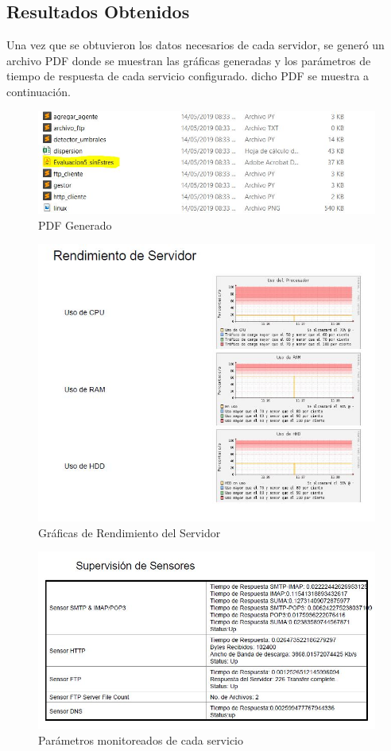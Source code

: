 \subsection{Resultados Obtenidos}
\noindent
Una vez que se obtuvieron los datos necesarios de cada servidor, se generó un archivo PDF donde se muestran las gráficas generadas y los parámetros de tiempo de respuesta de cada servicio configurado. dicho PDF se muestra a continuación.
\begin{figure}[H]
  \centering
    \includegraphics[scale=1]{imagenes/Captura.JPG}
    \caption{PDF Generado}
    \label{fig:http1}
\end{figure}
\begin{figure}[H]
  \centering
    \includegraphics[scale=1]{imagenes/aa1.JPG}
    \caption{Gráficas de Rendimiento del Servidor}
    \label{fig:http1}
\end{figure}
\begin{figure}[H]
  \centering
    \includegraphics[scale=1]{imagenes/aa2.JPG}
    \caption{Parámetros monitoreados de cada servicio}
    \label{fig:http1}
\end{figure}